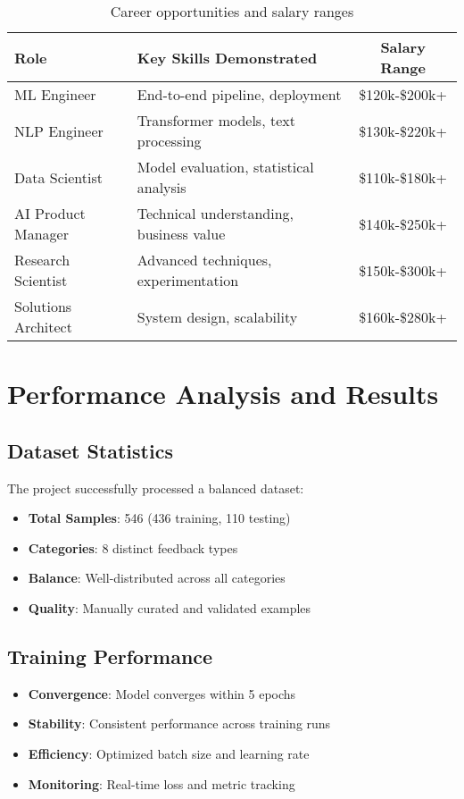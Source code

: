 \documentclass[11pt,a4paper]{article}
\begin{document}
\begin{table}[h!]
\centering
\begin{tabular}{|l|l|c|}
\hline
\textbf{Role} & \textbf{Key Skills Demonstrated} & \textbf{Salary Range} \\
\hline
ML Engineer & End-to-end pipeline, deployment & \$120k-\$200k+ \\
NLP Engineer & Transformer models, text processing & \$130k-\$220k+ \\
Data Scientist & Model evaluation, statistical analysis & \$110k-\$180k+ \\
AI Product Manager & Technical understanding, business value & \$140k-\$250k+ \\
Research Scientist & Advanced techniques, experimentation & \$150k-\$300k+ \\
Solutions Architect & System design, scalability & \$160k-\$280k+ \\
\hline
\end{tabular}
\caption{Career opportunities and salary ranges}
\end{table}

\section{Performance Analysis and Results}

\subsection{Dataset Statistics}
The project successfully processed a balanced dataset:
\begin{itemize}
  \item \textbf{Total Samples}: 546 (436 training, 110 testing)
  \item \textbf{Categories}: 8 distinct feedback types
  \item \textbf{Balance}: Well-distributed across all categories
  \item \textbf{Quality}: Manually curated and validated examples
\end{itemize}

\subsection{Training Performance}
\begin{itemize}
  \item \textbf{Convergence}: Model converges within 5 epochs
  \item \textbf{Stability}: Consistent performance across training runs
  \item \textbf{Efficiency}: Optimized batch size and learning rate
  \item \textbf{Monitoring}: Real-time loss and metric tracking
\end{itemize}
\end{document}
